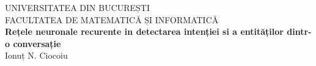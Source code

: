 \documentclass[12pt]{report}
\begin{document}
	

\begin{titlepage}
	
	\newcommand{\HRule}{\rule{\linewidth}{0.5mm}} %
	
	\center %
	
	
	\textsc{\LARGE UNIVERSITATEA DIN BUCUREȘTI}\\[1.5cm] %
	\textsc{\Large FACULTATEA DE MATEMATICĂ ȘI INFORMATICĂ}\\[4.5cm] %
	

	{ \huge \bfseries Rețele neuronale recurente in detectarea intenției si a entităților dintr-o conversație}\\[2cm] %
	
	

	
	\Large {Ionuț N. Ciocoiu}\\[3cm] %
	
	
	
	


\end{titlepage}
\end{document}
